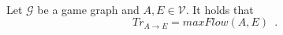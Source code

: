 \begin{theorem} \ \\
   \label{trustflow}
   Let $\mathcal{G}$ be a game graph and $A, E \in \mathcal{V}$. It holds that
   \begin{equation*}
      Tr_{A \rightarrow E} = maxFlow\left(A, E\right) \enspace.
   \end{equation*}
\end{theorem}
